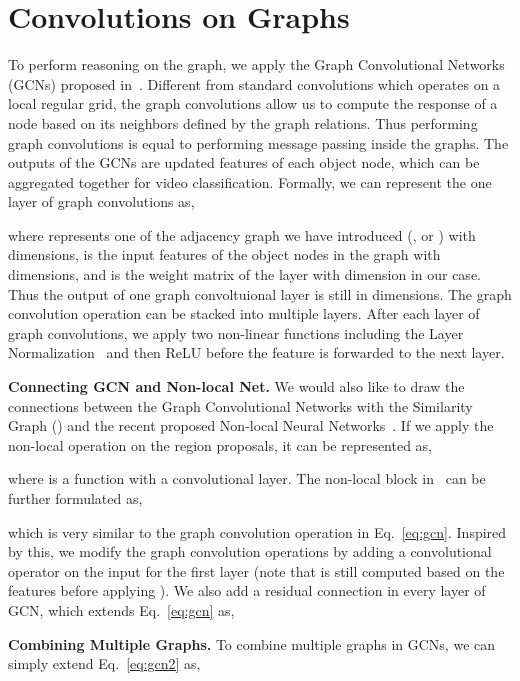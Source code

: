 \documentclass[runningheads]{llncs}
\begin{document}
\vspace{-0.1in}
\section{Convolutions on Graphs}
\vspace{-0.1in}


To perform reasoning on the graph, we apply the Graph Convolutional Networks (GCNs) proposed in~\cite{kipf2017semi}. Different from standard convolutions which operates on a local regular grid, the graph convolutions allow us to compute the response of a node based on its neighbors defined by the graph relations. Thus performing graph convolutions is equal to performing message passing inside the graphs. The outputs of the GCNs are updated features of each object node, which can be aggregated together for video classification. Formally, we can represent the one layer of graph convolutions as, 

where  represents one of the adjacency graph we have introduced (,  or ) with  dimensions,   is the input features of the object nodes in the graph with  dimensions, and  is the weight matrix of the layer with dimension  in our case. Thus the output of one graph convoltuional layer  is still in  dimensions.  The graph convolution operation can be stacked into multiple layers. After each layer of graph convolutions, we apply two non-linear functions including the Layer Normalization~\cite{Ba2016} and then ReLU before the feature  is forwarded to the next layer. 


\textbf{Connecting GCN and Non-local Net.} We would also like to draw the connections between the Graph Convolutional Networks with the Similarity Graph () and the recent proposed Non-local Neural Networks~\cite{xiaolongwang2017nonlocal}. If we apply the non-local operation on the region proposals, it can be represented as, 

where  is a function with a convolutional layer. The non-local block in~\cite{xiaolongwang2017nonlocal} can be further formulated as, 

which is very similar to the graph convolution operation in Eq.~\ref{eq:gcn}. Inspired by this, we modify the graph convolution operations by adding a convolutional operator on the input  for the first layer (note that  is still computed based on the features before applying ). We also add a residual connection in every layer of GCN, which extends Eq.~\ref{eq:gcn} as, 




\textbf{Combining Multiple Graphs.} To combine multiple graphs in GCNs, we can simply extend Eq.~\ref{eq:gcn2} as,
\end{document}
